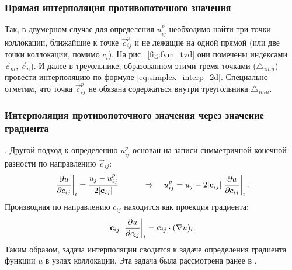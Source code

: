 \subsubsection{Прямая интерполяция противопоточного значения}
\label{sec:direct_interpolate_up}
Так, в двумерном случае для определения $u^p_{ij}$
необходимо найти три точки коллокации,
ближайшие к точке $\vec c^p_{ij}$ и не лежащие на одной прямой (или две точки коллокации, помимо $c_i$). На рис.~\ref{fig:fvm_tvd}
они помечены индексами $\vec c_m$, $\vec c_n$).
И далее в треуольнике, образованном этими тремя
точками ($\triangle_{imn}$) провести
интерполяцию
по формуле \cref{eq:simplex_interp_2d}.
Специально отметим, что точка $\vec c^p_{ij}$
не обязана содержаться внутри 
треугольника $\triangle_{imn}$.

\subsubsection{Интерполяция противопоточного значения через значение градиента}
\label{sec:grad_inteprolate_up}.
Другой подход к определению $u^p_{ij}$ основан на записи симметричной конечной разности
по направлению $\vec c_{ij}$:
\begin{equation*}
\left.\frac{\partial u}{\partial c_{ij}}\right|_i = \frac{u_j - u^p_{ij}}{2|\boldsymbol{\rm c}_{ij}|} \qquad \quad\Rightarrow\quad
u_{ij}^p = u_j - 2 |\boldsymbol{\rm c}_{ij}| \left. \frac{\partial u}{\partial c_{ij}}\right|_i.
\end{equation*}
Производная по направлению $c_{ij}$ находится как проекция градиента:
\begin{equation*}
|\boldsymbol{\rm c}_{ij}| \left.\frac{\partial u}{\partial c_{ij}}\right|_i = \boldsymbol{\rm c}_{ij} \cdot (\nabla u)_i.
\end{equation*}
Таким образом, задача интерполяции сводится к задаче определения градиента функции
$u$ в узлах коллокации. Эта задача была рассмотрена ранее в .

